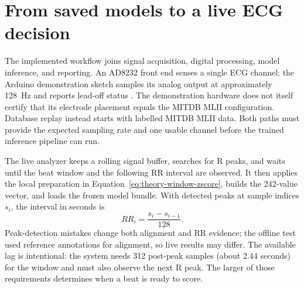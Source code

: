 \section{From saved models to a live ECG decision}

The implemented workflow joins signal acquisition, digital processing, model
inference, and reporting. An AD8232 front end senses a single ECG channel;
the Arduino demonstration sketch samples its analog output at approximately
128~Hz and reports lead-off status \cite{ad8232}. The demonstration hardware
does not itself certify that its electrode placement equals the MITDB MLII
configuration. Database replay instead starts with labelled MITDB MLII data.
Both paths must provide the expected sampling rate and one usable channel
before the trained inference pipeline can run.

The live analyzer keeps a rolling signal buffer, searches for R peaks, and
waits until the beat window and the following RR interval are observed. It
then applies the local preparation in Equation~\ref{eq:theory-window-zscore},
builds the 242-value vector, and loads the frozen model bundle. With detected
peaks at sample indices $s_i$, the interval in seconds is
\begin{equation}
 RR_i=\frac{s_i-s_{i-1}}{128}.
\end{equation}
Peak-detection mistakes change both alignment and RR evidence; the offline
test used reference annotations for alignment, so live results may differ.
The available lag is intentional: the system needs 312 post-peak samples
(about 2.44 seconds) for the window and must also observe the next R peak.
The larger of those requirements determines when a beat is ready to score.


